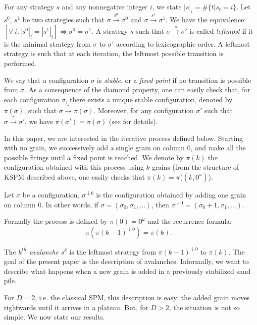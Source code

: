 \documentclass[11pt,a4paper]{llncs}
\begin{document}
 For any strategy $s$ and any nonnegative integer $i$, we state $|s|_i=\#\{ t | s_t = i \}$.  Let   $s^0$, $s^1$ be  two strategies such that $\sigma \overset{s^0}{\rightarrow} \sigma^0$ and $\sigma \overset{s^1}{\rightarrow} \sigma^1$.  We have the equivalence:  $[\forall~ i, |s^0|_i = |s^1|_i] \Leftrightarrow \sigma^0 = \sigma^1$.
 A strategy $s$ such that $\sigma \overset{s}{\rightarrow} \sigma'$ is called {\em leftmost} if it is the minimal strategy from $\sigma$ to $\sigma'$ according to lexicographic order. A leftmost strategy is such that at each iteration, the leftmost possible transition is performed. 

We say that a configuration $\sigma$ is \emph{stable}, or a \emph{fixed point} if no transition is possible from $\sigma$. 
As a  consequence of the diamond property, one can easily check that, for each configuration $\sigma$, there exists a unique stable configuration, denoted by $\pi(\sigma)$, such that  $\sigma \overset{*}{\rightarrow} \pi(\sigma)$. Moreover,  for any  
configuration $\sigma '$ such that $\sigma \overset{*}{\rightarrow} \sigma '$, we have $\pi(\sigma') = \pi(\sigma)$ (see \cite{goles02} for details). 

In this paper, we are interested in the iterative process defined below. Starting with no grain, we successively add a single  grain on  column 0, and make all the possible firings until  a fixed point is reached. We denote by $\pi(k)$ the configuration obtained with this process using $k$ grains (from the structure of KSPM described above, one easily checks that $\pi(k) = \pi((k,0^\omega)$).  


Let $\sigma$ be a configuration, $\sigma^{\downarrow 0}$ is the configuration obtained by adding one grain on column $0$. In other words, if $\sigma=(\sigma_0
,\sigma_1,\dots)$, then $\sigma^{\downarrow 0}=(\sigma_0 +1 ,\sigma_1,\dots)$. 

Formally the process is defined by $\pi (0) = 0^\omega$ and the recurrence formula: 
$$\pi(\pi(k-1)^{\downarrow 0})  =   \pi (k). $$


The {\em $k^{th}$ avalanche} $s^k$ is  the leftmost strategy from $\pi(k-1)^{\downarrow 0}$ to $\pi(k)$. 
The goal of the present paper is the description of avalanches. Informally, we want to describe what happens when a new grain is added in a previously stabilized sand pile.  


For $D = 2$, i.e.  the classical SPM, this description is easy: the added grain moves rightwards until it arrives in a plateau. But, for $D > 2$,  the situation is not so simple. We now state our results. 
\end{document}
